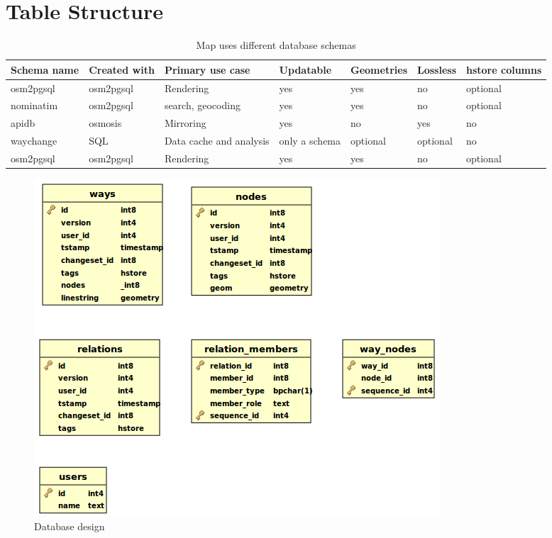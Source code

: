 \section{Table Structure}

\begin{table}[h!]
\caption{Map uses different database schemas}

\begin{tabular}{|p{2cm}|p{2cm}|p{2.5cm}|p{2cm}|p{2cm}|p{2cm}|p{2cm}|}
\hline
Schema name & Created with & Primary use case & Updatable
& Geometries & Lossless & hstore columns\\

\hline \rule[-2ex]{0pt}{5.5ex}
osm2pgsql & osm2pgsql & Rendering
& yes & yes & no & optional\\

\hline \rule[-2ex]{0pt}{5.5ex}  
nominatim & osm2pgsql & search, geocoding
& yes & yes & no & optional\\

\hline \rule[-2ex]{0pt}{5.5ex}  
apidb & osmosis & Mirroring
& yes & no & yes & no\\

\hline \rule[-2ex]{0pt}{5.5ex}  
waychange & SQL & Data cache and analysis
& only a schema & optional & optional & no\\

\hline \rule[-2ex]{0pt}{5.5ex}  
osm2pgsql & osm2pgsql & Rendering
& yes & yes & no & optional\\

\hline
\end{tabular}
\end{table}

\begin{figure}[h!]
	\centering
	\includegraphics[scale=0.8]{input/images/osm_db.png}
	\caption{Database design}
\end{figure}


